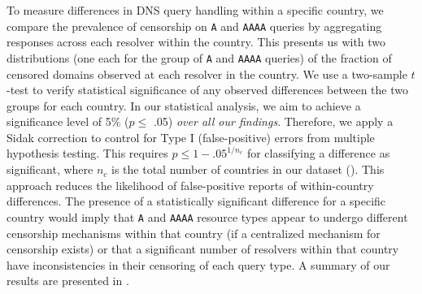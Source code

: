 To measure differences in DNS query handling within a specific country, we
compare the prevalence of censorship on {\tt A} and {\tt AAAA} queries by
aggregating responses across {each resolver within the country}. This presents
us with two distributions (one each for the group of {\tt A} and {\tt AAAA}
queries) of the fraction of censored domains observed at each resolver in the
country.
%
We use a two-sample $t$-test to verify statistical significance of any observed
differences between the two groups for each country. In our statistical
analysis, we aim to achieve a significance level of 5\% ($p \leq$  .05)
\emph{over all our findings}. Therefore, we apply a Sidak correction
\cite{abdi2007bonferroni} to control for Type I (false-positive) errors from multiple hypothesis
testing. 
%
This requires $p \leq 1-{.05}^{1/n_{c}}$ for classifying a difference as
significant, where $n_c$ is the total number of countries in our dataset
(). This approach reduces the likelihood of false-positive reports
of within-country differences.
%
The presence of a statistically significant difference for a specific country
would imply that \texttt{A} and \texttt{AAAA} resource types appear to undergo different censorship
mechanisms within that country (if a centralized mechanism for censorship
exists) or that a significant number of resolvers within that country have
inconsistencies in their censoring of each query type.
%
A summary of our results are presented in . 

